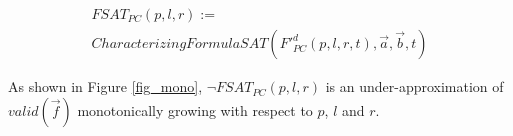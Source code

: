 \documentclass[conference]{IEEEtran}
\begin{document}
\begin{multline}\label{fsat_pc}
FSAT_{PC}(p,l,r):=\\
CharacterizingFormulaSAT(F'^d_{PC}(p,l,r,t),\vec{a},\vec{b},t)
\end{multline}

% 
As shown in Figure \ref{fig_mono},
$\neg FSAT_{PC}(p,l,r)$ is an under-approximation of $valid(\vec{f})$ monotonically growing with respect to 
$p$, $l$ and $r$.
\end{document}
